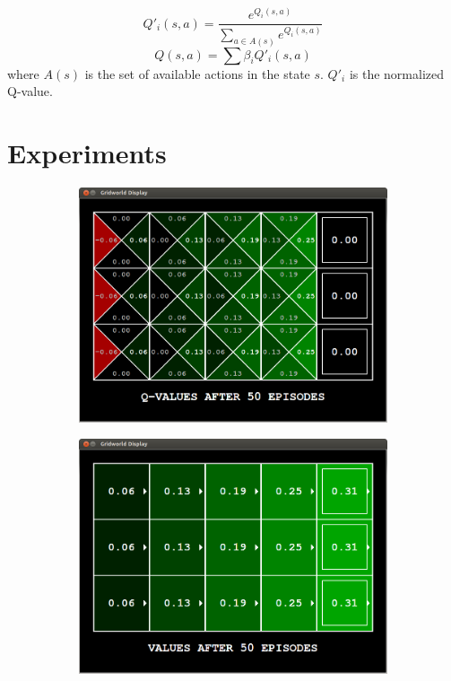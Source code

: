 \documentclass[11pt]{article}
\begin{document}
$$Q'_i(s, a) = \frac{e^{Q_i(s, a)}}{\sum\limits_{a \in A(s)}e^{Q_i(s, a)}}$$
$$Q(s, a) = \sum{\beta_i Q'_i(s, a)}$$
where $A(s)$ is the set of available actions in the state $s$.
$Q'_i$ is the normalized Q-value.

\section{Experiments}

\begin{figure}[h!]
\centering
\begin{subfigure}{0.9\textwidth}
	\includegraphics[width=\textwidth]{figure/sidewalk}
\end{subfigure}
\begin{subfigure}{0.9\textwidth}
	\includegraphics[width=\textwidth]{figure/sidewalk_v}
\end{subfigure}
\label{fig:rep}
\end{figure}
\end{document}
